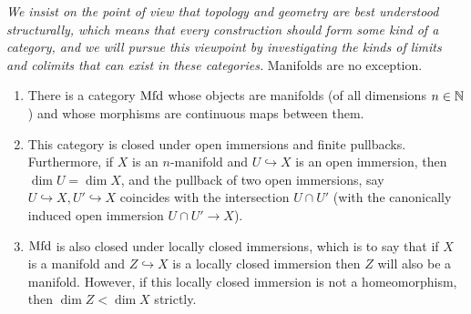         \textit{We insist on the point of view that topology and geometry are best understood structurally, which means that every construction should form some kind of a category, and we will pursue this viewpoint by investigating the kinds of limits and colimits that can exist in these categories.} Manifolds are no exception. 
        \begin{proposition} \label{prop: category_of_topological_manifolds}
            \begin{enumerate}
                \item There is a category $\mathrm{Mfd}$ whose objects are manifolds (of all dimensions $n \in \mathbb{N}$) and whose morphisms are continuous maps between them.
                \item This category is closed under open immersions and finite pullbacks. Furthermore, if $X$ is an $n$-manifold and $U \hookrightarrow  X$ is an open immersion, then $\dim U = \dim X$, and the pullback of two open immersions, say $U \hookrightarrow  X, U' \hookrightarrow  X$ coincides with the intersection $U \cap U'$ (with the canonically induced open immersion $U \cap U' \to X$). 
                \item $\mathrm{Mfd}$ is also closed under locally closed immersions, which is to say that if $X$ is a manifold and $Z \hookrightarrow X$ is a locally closed immersion then $Z$ will also be a manifold. However, if this locally closed immersion is not a homeomorphism, then $\dim Z < \dim X$ strictly.
            \end{enumerate}
        \end{proposition}
